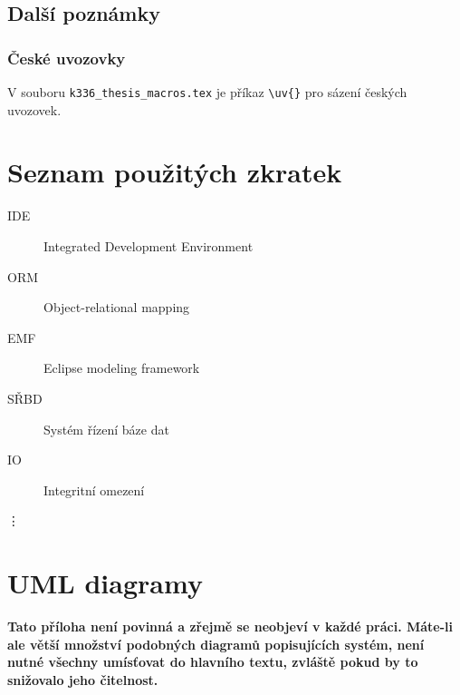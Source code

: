 \documentclass[11pt,twoside,a4paper]{book}
\begin{document}
\section{Další poznámky}
\subsection{České uvozovky}
V souboru \verb|k336_thesis_macros.tex| je příkaz \verb|\uv{}| pro sázení českých uvozovek. 


\chapter{Seznam použitých zkratek}

\begin{description}
\item[IDE] Integrated Development Environment
\item[ORM] Object-relational mapping
\item[EMF] Eclipse modeling framework
\item[SŘBD] Systém řízení báze dat
\item[IO] Integritní omezení
\end{description}
\vdots

\chapter{UML diagramy}
\textbf{\large Tato příloha není povinná a zřejmě se neobjeví v každé práci. Máte-li ale větší množství podobných diagramů popisujících systém, není nutné všechny umísťovat do hlavního textu, zvláště pokud by to snižovalo jeho čitelnost.}
\end{document}
